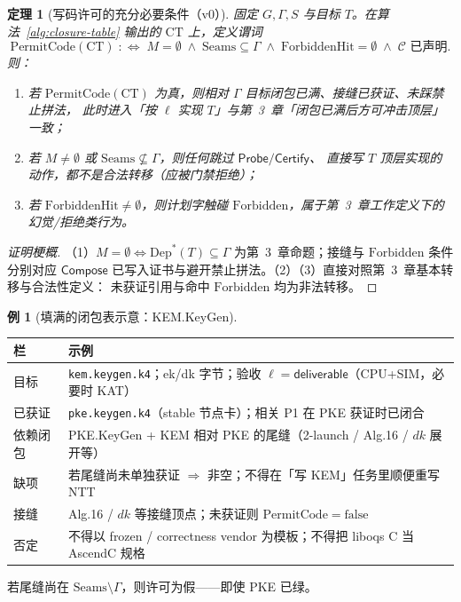 \documentclass[UTF8,a4paper,11pt]{ctexart}
\theoremstyle{definition}
\newtheorem{example}{例}[section]
\theoremstyle{plain}
\newtheorem{theorem}{定理}[section]
\theoremstyle{remark}
\numberwithin{figure}{section}
\numberwithin{table}{section}
\begin{document}
\begin{theorem}[写码许可的充分必要条件（v0）]
\label{thm:coding-permit}
固定 $G,\Gamma,S$ 与目标 $T$。在算法~\ref{alg:closure-table} 输出的 $\mathrm{CT}$ 上，定义谓词
\[
\mathrm{PermitCode}(\mathrm{CT})
\;:\iff\;
M=\emptyset
\;\land\;
\mathrm{Seams}\subseteq\Gamma
\;\land\;
\mathrm{ForbiddenHit}=\emptyset
\;\land\;
\mathcal{C}\text{ 已声明}.
\]
则：
\begin{enumerate}
  \item 若 $\mathrm{PermitCode}(\mathrm{CT})$ 为真，则相对 $\Gamma$ 目标闭包已满、接缝已获证、未踩禁止拼法，
        此时进入「按 $\ell$ 实现 $T$」与第~3~章「闭包已满后方可冲击顶层」一致；
  \item 若 $M\neq\emptyset$ 或 $\mathrm{Seams}\not\subseteq\Gamma$，则任何跳过 $\mathsf{Probe}/\mathsf{Certify}$、
        直接写 $T$ 顶层实现的动作，都不是合法转移（应被门禁拒绝）；
  \item 若 $\mathrm{ForbiddenHit}\neq\emptyset$，则计划字触碰 $\mathrm{Forbidden}$，属于第~3~章工作定义下的幻觉/拒绝类行为。
\end{enumerate}
\end{theorem}
\begin{proof}[证明梗概]
（1）$M=\emptyset\Leftrightarrow\mathrm{Dep}^*(T)\subseteq\Gamma$ 为第~3~章命题；接缝与 $\mathrm{Forbidden}$ 条件分别对应
$\mathsf{Compose}$ 已写入证书与避开禁止拼法。（2）（3）直接对照第~3~章基本转移与合法性定义：
未获证引用与命中 $\mathrm{Forbidden}$ 均为非法转移。
\end{proof}

\begin{example}[填满的闭包表示意：KEM.KeyGen]
\begin{center}
\begin{tabular}{@{}L{2.4cm}L{11.4cm}@{}}
  \toprule
  栏 & 示例 \\
  \midrule
  目标 &
  \texttt{kem.keygen.k4}；ek/dk 字节；验收 $\ell=\mathsf{deliverable}$（CPU+SIM，必要时 KAT） \\
  已获证 &
  \texttt{pke.keygen.k4}（stable 节点卡）；相关 P1 在 PKE 获证时已闭合 \\
  依赖闭包 &
  PKE.KeyGen + KEM 相对 PKE 的尾缝（2-launch / Alg.16 / $\mathit{dk}$ 展开等） \\
  缺项 &
  若尾缝尚未单独获证 $\Rightarrow$ 非空；不得在「写 KEM」任务里顺便重写 NTT \\
  接缝 &
  Alg.16 / $\mathit{dk}$ 等接缝顶点；未获证则 $\mathrm{PermitCode}=\mathrm{false}$ \\
  否定 &
  不得以 frozen / correctness vendor 为模板；不得把 liboqs C 当 AscendC 规格 \\
  \bottomrule
\end{tabular}
\end{center}
若尾缝尚在 $\mathrm{Seams}\setminus\Gamma$，则许可为假——即使 PKE 已绿。
\end{example}
\end{document}
